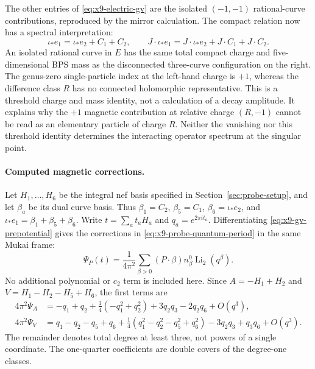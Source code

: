 The other entries of \eqref{eq:x9-electric-gv} are the isolated
$(-1,-1)$ rational-curve contributions, reproduced by the mirror
calculation. The compact relation now has a spectral interpretation:
\begin{equation}
 \iota_*e_1=\iota_*e_2+C_1+C_2,
 \qquad
 J\cdot\iota_*e_1=J\cdot\iota_*e_2+J\cdot C_1+J\cdot C_2.
 \label{eq:x9-m2-threshold-relation}
\end{equation}
An isolated rational curve in $E$ has the same total compact charge
and five-dimensional BPS mass as the disconnected three-curve
configuration on the right. The genus-zero single-particle index
at the left-hand charge is $+1$, whereas the difference class $R$
has no connected holomorphic representative. This is a threshold
charge and mass identity, not a calculation of a decay amplitude.
It explains why the $+1$ magnetic contribution at relative charge
$(R,-1)$ cannot be read as an elementary particle of charge $R$.
Neither the vanishing nor this threshold identity determines the
interacting operator spectrum at the singular point.

\paragraph{Computed magnetic corrections.}
Let $H_1,\ldots,H_6$ be the integral nef basis specified in Section~\ref{sec:probe-setup}, and let $\beta_a$ be its dual curve basis.
Thus $\beta_1=C_2$, $\beta_5=C_1$, $\beta_6=\iota_*e_2$, and
$\iota_*e_1=\beta_1+\beta_5+\beta_6$.
Write $t=\sum_a t_aH_a$ and $q_a=e^{2\pi i t_a}$.
Differentiating \eqref{eq:x9-gv-prepotential} gives the corrections
in \eqref{eq:x9-probe-quantum-period} in the same Mukai frame:
\begin{equation}
 \Psi_P(t)=\frac{1}{4\pi^2}\sum_{\beta>0}
      (P\cdot\beta)n^0_\beta\operatorname{Li}_2(q^\beta).
 \label{eq:x9-computed-magnetic-period}
\end{equation}
No additional polynomial or $c_2$ term is included here. Since
$A=-H_1+H_2$ and $V=H_1-H_2-H_5+H_6$, the first terms are
\begin{equation}
 \begin{aligned}
 4\pi^2\Psi_A&=-q_1+q_2+\tfrac14(-q_1^2+q_2^2)
                     +3q_2q_3-2q_2q_6+O(q^3),\\
 4\pi^2\Psi_V&=q_1-q_2-q_5+q_6
          +\tfrac14(q_1^2-q_2^2-q_5^2+q_6^2)
                     -3q_2q_3+q_3q_6+O(q^3).
 \end{aligned}
 \label{eq:x9-magnetic-period-leading}
\end{equation}
The remainder denotes total degree at least three, not powers of a
single coordinate. The one-quarter coefficients are double covers
of the degree-one classes.

